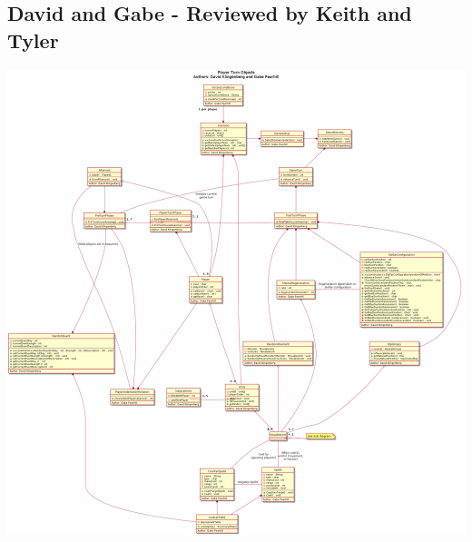\documentclass[12pt,a4paper]{article}
\begin{document}
\subsection{David and Gabe - Reviewed by Keith and Tyler}
\includegraphics[width=\textwidth]{DavidGabeDiagram.png}
\end{document}
